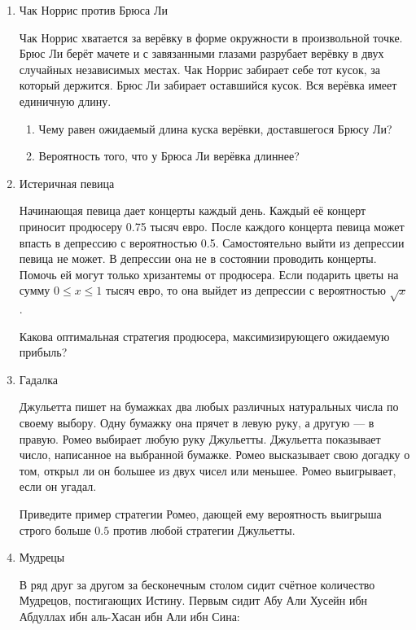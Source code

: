 \documentclass[12pt, a4paper]{article}\usepackage[]{graphicx}\usepackage[]{color}
\begin{document}
\begin{enumerate}

							\item Чак Норрис против Брюса Ли

							Чак Норрис хватается за верёвку в форме окружности в произвольной точке. Брюс Ли берёт мачете и с завязанными глазами разрубает верёвку в двух случайных независимых местах. Чак Норрис забирает себе тот кусок, за который держится. Брюс Ли забирает оставшийся кусок.  Вся верёвка имеет единичную длину.
							\begin{enumerate}
								\item Чему равен ожидаемый длина куска верёвки, доставшегося Брюсу Ли?
								\item  Вероятность того, что у Брюса Ли верёвка длиннее?
							\end{enumerate}

							\item Истеричная певица

							Начинающая певица дает концерты каждый день. Каждый её концерт приносит продюсеру 0.75 тысяч евро. После каждого концерта певица может впасть в депрессию с вероятностью 0.5. Самостоятельно выйти из депрессии певица не может. В депрессии она не в состоянии проводить концерты. Помочь ей могут только хризантемы от продюсера. Если подарить цветы на сумму $0\le x\le 1$ тысяч евро, то она выйдет из депрессии с вероятностью $\sqrt{x}$.

							Какова оптимальная стратегия продюсера, максимизирующего ожидаемую прибыль?

							\newpage
							\item Гадалка

							Джульетта пишет на бумажках два любых различных натуральных числа по своему выбору. Одну бумажку она прячет в левую руку, а другую — в правую. Ромео выбирает любую руку Джульетты. Джульетта показывает число, написанное на выбранной бумажке. Ромео высказывает свою догадку о том, открыл ли он большее из двух чисел или меньшее. Ромео выигрывает, если он угадал.

							Приведите пример стратегии Ромео, дающей ему вероятность выигрыша строго больше $0.5$ против любой стратегии Джульетты.

							\item Мудрецы

							В ряд друг за другом за бесконечным столом сидит счётное количество Мудрецов, постигающих Истину. Первым сидит Абу Али Хусейн ибн Абдуллах ибн аль-Хасан ибн Али ибн Сина:


\end{enumerate}
\end{document}
